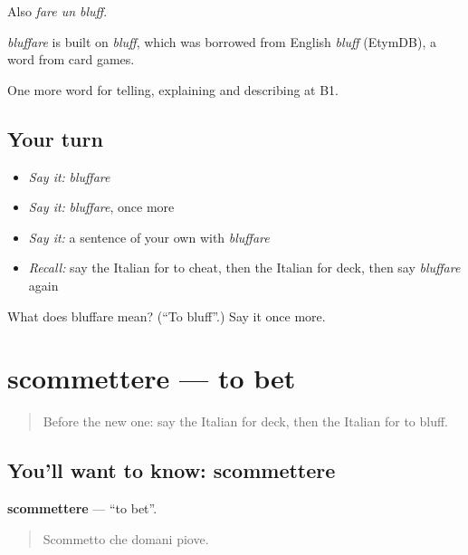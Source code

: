 Also \emph{fare un bluff}.

\begin{cousinweb}
\emph{bluffare} is built on \emph{bluff}, which was borrowed from English \emph{bluff} (EtymDB), a word from card games.
\end{cousinweb}

\begin{grammarlens}[title={What you've built}]
One more word for telling, explaining and describing at B1.
\end{grammarlens}

\subsection*{Your turn}
\begin{itemize}
\raggedright
  \item \emph{Say it:} \emph{bluffare}
  \item \emph{Say it:} \emph{bluffare}, once more
  \item \emph{Say it:} a sentence of your own with \emph{bluffare}
  \item \emph{Recall:} say the Italian for to cheat, then the Italian for deck, then say \emph{bluffare} again
\end{itemize}

\begin{tcolorbox}[breakable,colback=teal!4,colframe=teal!35!black,title={Before you move on}]
What does bluffare mean? (\textquotedblleft{}To bluff\textquotedblright{}.) Say it once more.
\end{tcolorbox}
\section[scommettere]{scommettere — to bet}

\label{lesson:IT-C504-scommettere}



\begin{quote}
Before the new one: say the Italian for deck, then the Italian for to bluff.
\end{quote}

\subsection*{You'll want to know: scommettere}
\textbf{scommettere} — \textquotedblleft{}to bet\textquotedblright{}.

\begin{quote}
Scommetto che domani piove.
\end{quote}

